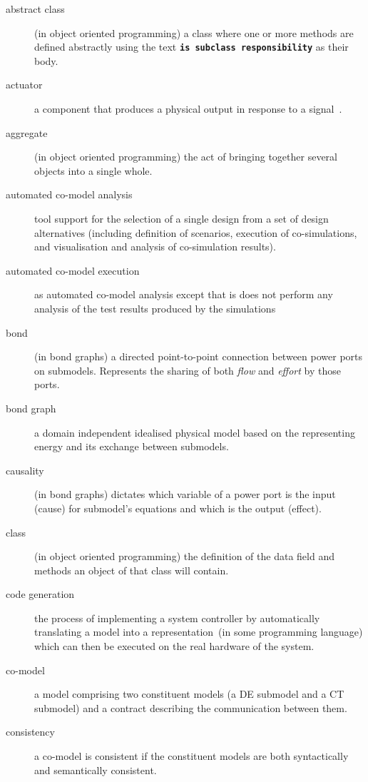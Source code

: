 \documentclass{crescendorepchap}
\begin{document}
\begin{description}
\item[abstract class] (in object oriented programming) a class where one or more methods are defined abstractly using the text \textbf{\texttt{is subclass responsibility}} as their body.
\item[actuator] a component that produces a physical output in response to a signal~\cite{IEEE100}.
\item[aggregate] (in object oriented programming) the act of bringing together several objects into a single whole.
\item[automated co-model analysis] tool support for the selection of a single design from a set of design alternatives (including definition of scenarios, execution of co-simulations, and visualisation and analysis of co-simulation results).
\item[automated co-model execution] as automated co-model analysis except that is does not perform any analysis of the test results produced by the simulations
\item[bond] (in bond graphs) a directed point-to-point connection between power ports on submodels.  Represents the sharing of both \textit{flow} and \textit{effort} by those ports.
\item[bond graph] a domain independent idealised physical model based on the representing energy and its exchange between submodels.
\item[causality] (in bond graphs) dictates which variable of a power port is the input (cause) for submodel's equations and which is the output (effect).
\item[class] (in object oriented programming) the definition of the data field and methods an object of that class will contain.
\item[code generation] the process of implementing a system controller by automatically translating a model into a representation~(in some programming language) which can then be executed on the real hardware of the system.
\item[co-model] a model comprising two constituent models (a DE submodel and a CT submodel) and a contract describing the communication between them.
\item[consistency] a co-model is consistent if the constituent models are both syntactically and semantically consistent.

\end{description}
\end{document}

